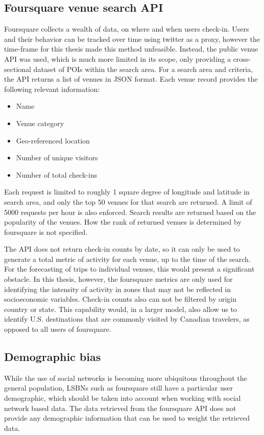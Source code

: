 \subsection{Foursquare venue search API}
Foursquare collects a wealth of data, on where and when users check-in. Users and their behavior can be tracked over time using twitter as a proxy, however the time-frame for this thesis made this method unfeasible. Instead, the public venue API was used, which is much more limited in its scope, only providing a cross-sectional dataset of POIs within the search area. For a search area and criteria, the API returns a list of venues in JSON format. Each venue record provides the following relevant information:
\begin{itemize}
\item Name
\item Venue category
\item Geo-referenced location
\item Number of unique visitors
\item Number of total check-ins
\end{itemize}

Each request is limited to roughly 1 square degree of longitude and latitude in search area, and only the top 50 venues for that search are returned. A limit of 5000 requests per hour is also enforced. Search results are returned based on the popularity of the venues. How the rank of returned venues is determined by foursquare is not specified. 

The API does not return check-in counts by date, so it can only be used to generate a total metric of activity for each venue, up to the time of the search. For the forecasting of trips to individual venues, this would present a significant obstacle. In this thesis, however, the foursquare metrics are only used for identifying the intensity of activity in zones that may not be reflected in socioeconomic variables. Check-in counts also can not be filtered by origin country or state. This capability would, in a larger model, also allow us to identify U.S. destinations that are commonly visited by Canadian travelers, as opposed to all users of foursquare.

\subsection{Demographic bias}
While the use of social networks is becoming more ubiquitous throughout the general population, LSBNs such as foursquare still have a particular user demographic, which should be taken into account when working with social network based data. The data retrieved from the foursquare API does not provide any demographic information that can be used to weight the retrieved data.

